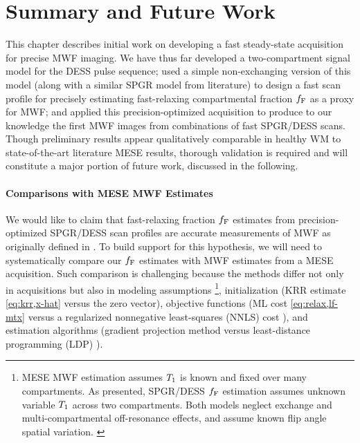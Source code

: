\section{Summary and Future Work}
\label{s,mwf,summ}

This chapter describes initial work 
on developing a fast steady-state acquisition
for precise MWF imaging.
We have thus far developed
a two-compartment signal model 
for the DESS pulse sequence;
used a simple non-exchanging version 
of this model 
(along with a similar SPGR model
from literature)
to design a fast scan profile
for precisely estimating 
fast-relaxing compartmental fraction $f_{\mathrm{F}}$
as a proxy for MWF;
and applied this precision-optimized acquisition
\invivo to produce to our knowledge the first MWF images 
from combinations of fast SPGR/DESS scans.
Though preliminary results appear qualitatively comparable
in healthy WM
to state-of-the-art literature MESE results,
thorough validation is required
and will constitute a major portion 
of future work,
discussed in the following.

\paragraph{Comparisons with MESE MWF Estimates}
We would like to claim
that fast-relaxing fraction $f_{\mathrm{F}}$ estimates
from precision-optimized SPGR/DESS scan profiles
are accurate measurements 
of MWF as originally defined 
in \cite{mackay:94:ivv}.
To build support
for this hypothesis,
we will need
to systematically compare our $f_{\mathrm{F}}$ estimates
with MWF estimates
from a MESE acquisition.
Such comparison is challenging
because the methods differ
not only in acquisitions
but also in modeling assumptions
\footnote{MESE MWF estimation 
	assumes $T_1$ is known and fixed
	over many compartments.
	As presented, SPGR/DESS $f_{\mathrm{F}}$ estimation
	assumes unknown variable $T_1$
	across two compartments.
	Both models neglect exchange 
	and multi-compartmental off-resonance effects,
	and assume known flip angle spatial variation.
	\label{foot:mwf,assumption}
},
initialization
(KRR estimate \eqref{eq:krr,x-hat}
versus the zero vector),
objective functions
(ML cost \eqref{eq:relax,lf-mtx}
versus a regularized nonnegative least-squares (NNLS) cost
\cite[Eq.~8]{whittall:89:qio}),
and estimation algorithms
(gradient projection method \cite{rosen:60:tgp}
versus
least-distance programming (LDP) \cite[\S23.4]{lawson:74}).

